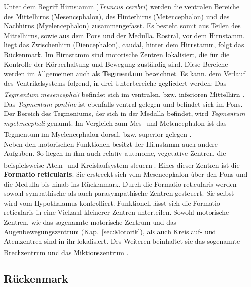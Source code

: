 \documentclass[12pt,a4paper,pdftex]{article}
\begin{document}
Unter dem Begriff Hirnstamm (\textit{Truncus cerebri}) werden die ventralen Bereiche des Mittelhirns (Mesencephalon), des Hinterhirns (Metencephalon) und des Nachhirns (Myelencephalon) zusammengefasst. Es besteht somit aus Teilen des Mittelhirns, sowie aus dem Pons und der Medulla. Rostral, vor dem Hirnstamm, liegt das Zwischenhirn (Diencephalon), caudal, hinter dem Hirnstamm, folgt das Rückenmark. Im Hirnstamm sind motorische Zentren lokalisiert, die für die Kontrolle der Körperhaltung und Bewegung zuständig sind. Diese Bereiche werden im Allgemeinen auch als \textbf{Tegmentum} bezeichnet. Es kann, dem Verlauf des Ventrikelsystems folgend, in drei Unterbereiche gegliedert werden: Das \textit{Tegmentum mesencephali} befindet sich im ventralen, bzw. inferioren Mittelhirn \textsuperscript{\cite[6]{trepel2011neuroanatomie}}. Das \textit{Tegmentum pontine} ist ebenfalls ventral gelegen und befindet sich im Pons. Der Bereich des Tegmentums, der sich in der Medulla befindet, wird \textit{Tegmentum myelencephali} genannt. Im Vergleich zum Mes- und Metencephalon ist das Tegmentum im Myelencephalon dorsal, bzw. superior gelegen \textsuperscript{\cite[5]{trepel2011neuroanatomie}}.\\

\noindent Neben den motorischen Funktionen besitzt der Hirnstamm auch andere Aufgaben. So liegen in ihm auch relativ autonome, vegetative Zentren, die beispielsweise Atem- und Kreislaufsystem steuern \textsuperscript{\cite[14]{penzlin2005tierphys}}. Eines dieser Zentren ist die \textbf{Formatio reticularis}. Sie erstreckt sich vom Mesencephalon über den Pons und die Medulla bis hinab ins Rückenmark. Durch die Formatio reticularis werden sowohl sympathische als auch parasympathische Zentren gesteuert. Sie selbst wird vom Hypothalamus kontrolliert. Funktionell lässt sich die Formatio reticularis in eine Vielzahl kleinerer Zentren unterteilen. Sowohl motorische Zentren, wie das sogenannte motorische Zentrum und das Augenbewegungszentrum (Kap.~\ref{sec:Motorik}), als auch Kreislauf- und Atemzentren sind in ihr lokalisiert. Des Weiteren beinhaltet sie das sogenannte Brechzentrum und das Miktionszentrum \textsuperscript{\cite[6]{trepel2011neuroanatomie}}.


\subsection{Rückenmark}
\label{subsec:Rueckenmark} 
\end{document}
